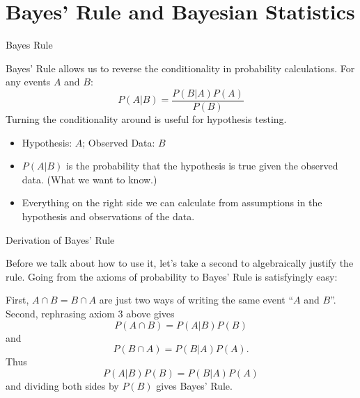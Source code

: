 \documentclass[
  ignorenonframetext,
]{beamer}
\providecommand{\tightlist}{%
  \setlength{\itemsep}{0pt}\setlength{\parskip}{0pt}}
\begin{document}
\hypertarget{bayes-rule-and-bayesian-statistics}{%
\section{Bayes' Rule and Bayesian
Statistics}\label{bayes-rule-and-bayesian-statistics}}

\begin{frame}{Bayes Rule}
\protect\hypertarget{bayes-rule}{}

Bayes' Rule allows us to reverse the conditionality in probability
calculations. For any events \(A\) and \(B\): \[
P(A|B)=\frac{P(B|A)P(A)}{P(B)}
\] Turning the conditionality around is useful for hypothesis testing.

\begin{itemize}
\tightlist
\item
  Hypothesis: \(A\); Observed Data: \(B\)
\item
  \(P(A|B)\) is the probability that the hypothesis is true given the
  observed data. (What we want to know.)
\item
  Everything on the right side we can calculate from assumptions in the
  hypothesis and observations of the data.
\end{itemize}

\end{frame}

\begin{frame}{Derivation of Bayes' Rule}
\protect\hypertarget{derivation-of-bayes-rule}{}

Before we talk about how to use it, let's take a second to algebraically
justify the rule. Going from the axioms of probability to Bayes' Rule is
satisfyingly easy:

First, \(A\cap B = B\cap A\) are just two ways of writing the same event
``\(A\) and \(B\)''. Second, rephrasing axiom 3 above gives \[
P(A\cap B) = P(A|B)P(B)
\] and \[
P(B\cap A)=P(B|A)P(A).
\] Thus \[
P(A|B)P(B)=P(B|A)P(A)
\] and dividing both sides by \(P(B)\) gives Bayes' Rule.

\end{frame}
\end{document}

